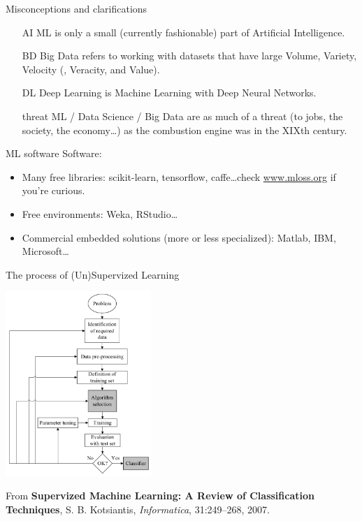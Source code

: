 \documentclass{beamer}
\begin{document}
\begin{frame}{Misconceptions and clarifications}
\begin{itemize}
\item[AI] ML is only a small (currently fashionable) part of Artificial Intelligence.
\item[BD] Big Data refers to working with datasets that have large Volume, Variety, Velocity (, Veracity, and Value).
\item[DL] Deep Learning is Machine Learning with Deep Neural Networks.
\item[threat] ML / Data Science / Big Data are as much of a threat (to jobs, the society, the economy\ldots) as the combustion engine was in the XIXth century.
\end{itemize}
\end{frame}

\begin{frame}{ML software}
Software:
\begin{itemize}
\item Many free libraries: scikit-learn, tensorflow, caffe\ldots check \url{www.mloss.org} if you're curious.
\item Free environments: Weka, RStudio\ldots
\item Commercial embedded solutions (more or less specialized): Matlab, IBM, Microsoft\ldots
\end{itemize}
\end{frame}

\begin{frame}{The process of (Un)Supervized Learning}
\begin{center}
\includegraphics[height=7cm]{img/process.png}
\end{center}
\vspace{-0.5cm}
{\footnotesize From \textbf{Supervized Machine Learning: A Review of Classification Techniques}, S. B. Kotsiantis, \textit{Informatica}, 31:249--268, 2007.}
\end{frame}
\end{document}

